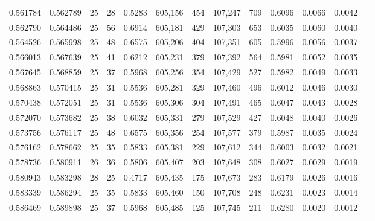 \begin{tabular}{rrrrrrrrrrrrr}
0.561784 & 0.562789 &    25 &  28 &                                     0.5283 & 605,156 &     454 & 107,247 &     709 & 0.6096 & 0.0066 & 0.0042 \\
0.562790 & 0.564486 &    25 &  56 &                                     0.6914 & 605,181 &     429 & 107,303 &     653 & 0.6035 & 0.0060 & 0.0040 \\
0.564526 & 0.565998 &    25 &  48 &                                     0.6575 & 605,206 &     404 & 107,351 &     605 & 0.5996 & 0.0056 & 0.0037 \\
0.566013 & 0.567639 &    25 &  41 &                                     0.6212 & 605,231 &     379 & 107,392 &     564 & 0.5981 & 0.0052 & 0.0035 \\
0.567645 & 0.568859 &    25 &  37 &                                     0.5968 & 605,256 &     354 & 107,429 &     527 & 0.5982 & 0.0049 & 0.0033 \\
0.568863 & 0.570415 &    25 &  31 &                                     0.5536 & 605,281 &     329 & 107,460 &     496 & 0.6012 & 0.0046 & 0.0030 \\
0.570438 & 0.572051 &    25 &  31 &                                     0.5536 & 605,306 &     304 & 107,491 &     465 & 0.6047 & 0.0043 & 0.0028 \\
0.572070 & 0.573682 &    25 &  38 &                                     0.6032 & 605,331 &     279 & 107,529 &     427 & 0.6048 & 0.0040 & 0.0026 \\
0.573756 & 0.576117 &    25 &  48 &                                     0.6575 & 605,356 &     254 & 107,577 &     379 & 0.5987 & 0.0035 & 0.0024 \\
0.576162 & 0.578662 &    25 &  35 &                                     0.5833 & 605,381 &     229 & 107,612 &     344 & 0.6003 & 0.0032 & 0.0021 \\
0.578736 & 0.580911 &    26 &  36 &                                     0.5806 & 605,407 &     203 & 107,648 &     308 & 0.6027 & 0.0029 & 0.0019 \\
0.580943 & 0.583298 &    28 &  25 &                                     0.4717 & 605,435 &     175 & 107,673 &     283 & 0.6179 & 0.0026 & 0.0016 \\
0.583339 & 0.586294 &    25 &  35 &                                     0.5833 & 605,460 &     150 & 107,708 &     248 & 0.6231 & 0.0023 & 0.0014 \\
0.586469 & 0.589898 &    25 &  37 &                                     0.5968 & 605,485 &     125 & 107,745 &     211 & 0.6280 & 0.0020 & 0.0012 \\

\end{tabular}
